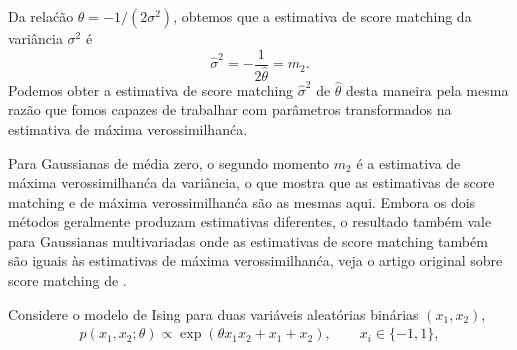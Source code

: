 \begin{exenumerate}
\begin{solution}
        Da rela\'c\~ao $\theta = -1/(2 \sigma^2)$, obtemos que a estimativa de score matching da vari\^ancia $\sigma^2$ \'e
        \begin{equation}
            \hat{\sigma}^2 = - \frac{1}{2\hat{\theta}} = m_2.
        \end{equation}
        Podemos obter a estimativa de score matching $\hat{\sigma}^2$ de
        $\hat{\theta}$ desta maneira pela mesma raz\~ao que fomos
        capazes de trabalhar com par\^ametros transformados na estimativa de
        m\'axima verossimilhan\'ca.
        
        Para Gaussianas de m\'edia zero, o segundo momento $m_2$ \'e a estimativa de m\'axima
        verossimilhan\'ca da vari\^ancia, o que mostra que as estimativas de score matching e de m\'axima
        verossimilhan\'ca s\~ao as mesmas aqui. Embora os dois m\'etodos geralmente
        produzam estimativas diferentes, o resultado tamb\'em vale para
        Gaussianas multivariadas onde as estimativas de score matching tamb\'em s\~ao iguais \`as estimativas de
        m\'axima verossimilhan\'ca, veja o artigo original sobre score matching de
        \citet{Hyvarinen2005c}.
        
    \end{solution}
    
\end{exenumerate}


Considere o modelo de Ising para duas vari\'aveis aleat\'orias bin\'arias $(x_1,x_2)$,
\begin{align*}
    p(x_1,x_2;\theta) \propto \exp\left(\theta x_1 x_2+x_1+x_2\right), \quad \quad x_i \in \{-1,1\},
\end{align*}

